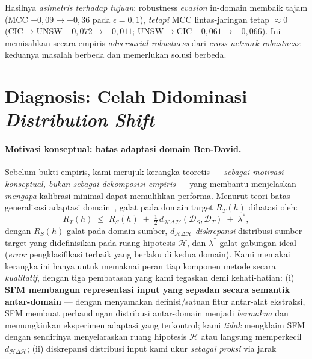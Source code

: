 \documentclass[11pt,a4paper]{article}
\begin{document}
Hasilnya \emph{asimetris terhadap tujuan}: robustness \emph{evasion} in-domain
membaik tajam (MCC $-0{,}09 \rightarrow +0{,}36$ pada $\epsilon=0{,}1$),
\emph{tetapi} MCC lintas-jaringan tetap $\approx 0$ (CIC$\rightarrow$UNSW
$-0{,}072 \rightarrow -0{,}011$; UNSW$\rightarrow$CIC $-0{,}061 \rightarrow
-0{,}066$). Ini memisahkan secara empiris \emph{adversarial-robustness} dari
\emph{cross-network-robustness}: keduanya masalah berbeda dan memerlukan solusi
berbeda.
\fi

\section{Diagnosis: Celah Didominasi \emph{Distribution Shift}}
\label{sec:align}

\paragraph{Motivasi konseptual: batas adaptasi domain Ben-David.} Sebelum bukti
empiris, kami merujuk kerangka teoretis --- \emph{sebagai motivasi konseptual,
bukan sebagai dekomposisi empiris} --- yang membantu menjelaskan \emph{mengapa}
kalibrasi minimal dapat memulihkan performa. Menurut teori batas generalisasi
adaptasi domain~\cite{bendavid}, galat pada domain target $R_T(h)$ dibatasi oleh:
\begin{equation}
\label{eq:bendavid}
R_T(h) \;\le\; R_S(h) \;+\; \tfrac{1}{2}\, d_{\mathcal{H}\Delta\mathcal{H}}(\mathcal{D}_S, \mathcal{D}_T) \;+\; \lambda^\ast,
\end{equation}
dengan $R_S(h)$ galat pada domain sumber, $d_{\mathcal{H}\Delta\mathcal{H}}$
\emph{diskrepansi} distribusi sumber--target yang didefinisikan pada ruang
hipotesis $\mathcal{H}$, dan $\lambda^\ast$ galat gabungan-ideal (\emph{error}
pengklasifikasi terbaik yang berlaku di kedua domain). Kami memakai kerangka ini
hanya untuk memaknai peran tiap komponen metode secara \emph{kualitatif}, dengan
tiga pembatasan yang kami tegaskan demi kehati-hatian: (i) \textbf{SFM membangun
representasi input yang sepadan secara semantik antar-domain} --- dengan menyamakan
definisi/satuan fitur antar-alat ekstraksi, SFM membuat perbandingan distribusi
antar-domain menjadi \emph{bermakna} dan memungkinkan eksperimen adaptasi yang
terkontrol; kami \emph{tidak} mengklaim SFM dengan sendirinya menyelaraskan ruang
hipotesis $\mathcal{H}$ atau langsung memperkecil $d_{\mathcal{H}\Delta\mathcal{H}}$;
(ii) diskrepansi distribusi input kami ukur \emph{sebagai proksi} via jarak
\end{document}
